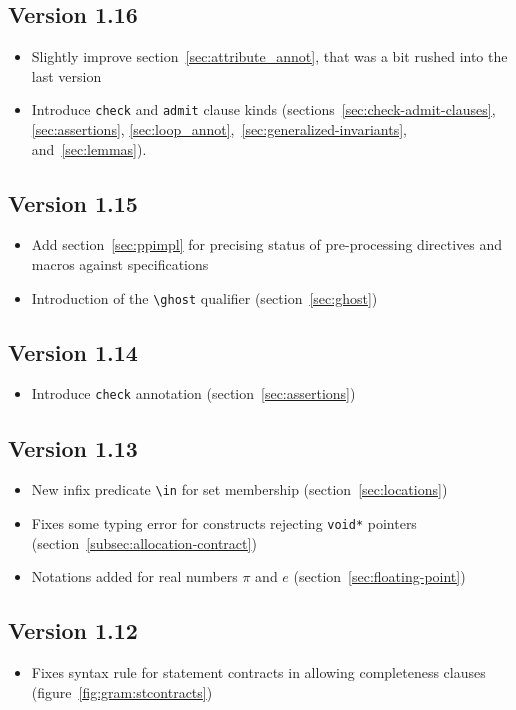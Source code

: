 \subsection{Version 1.16}
\begin{itemize}
\item Slightly improve section~\ref{sec:attribute_annot}, that was a bit rushed into
the last version
\item Introduce \lstinline|check| and \lstinline|admit| clause kinds
(sections~\ref{sec:check-admit-clauses}, \ref{sec:assertions},
\ref{sec:loop_annot},~\ref{sec:generalized-invariants}, and~\ref{sec:lemmas}).
\end{itemize}
\subsection{Version 1.15}
\begin{itemize}
\item Add section~\ref{sec:ppimpl} for precising status of pre-processing
  directives and macros against specifications
\item Introduction of the \lstinline|\ghost| qualifier (section~\ref{sec:ghost})
\end{itemize}
\subsection{Version 1.14} %
\begin{itemize}
\item Introduce \lstinline|check| annotation (section~\ref{sec:assertions})
\end{itemize}

\subsection{Version 1.13} %
\begin{itemize}
\item New infix predicate \lstinline|\in| for set membership
  (section~\ref{sec:locations})
\item Fixes some typing error for constructs rejecting
  \lstinline|void*| pointers (section~\ref{subsec:allocation-contract})
\item Notations added for real numbers $\pi$ and $e$
  (section~\ref{sec:floating-point})
\end{itemize}

\subsection{Version 1.12} %
\begin{itemize}
\item Fixes syntax rule for statement contracts in allowing completeness clauses
  (figure~\ref{fig:gram:stcontracts})
\end{itemize}


